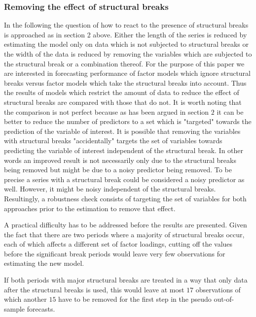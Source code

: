 \documentclass[12pt]{article}
\begin{document}
\subsubsection{Removing the effect of structural breaks}

In the following the question of how to react to the presence of structural breaks is approached as in section 2 above. Either the length of the series is reduced by estimating the model only on data which is not subjected to structural breaks or the width of the data is reduced by removing the variables which are subjected to the structural break or a combination thereof. For the purpose of this paper we are interested in forecasting performance of factor models which ignore structural breaks versus factor models which take the structural breaks into account. Thus the results of models which restrict the amount of data to reduce the effect of structural breaks are compared with those that do not. It is worth noting that the comparison is not perfect because as has been argued in section $2$ it can be better to reduce the number of predictors to a set which is "targeted" towards the prediction of the variable of interest. It is possible that removing the variables with structural breaks "accidentally" targets the set of variables towards predicting the variable of interest independent of the structural break. In other words an improved result is not necessarily only due to the structural breaks being removed but might be due to a noisy predictor being removed. To be precise a series with a structural break could be considered a noisy predictor as well. However, it might be noisy independent of the structural breaks.
Resultingly, a robustness check consists of targeting the set of variables for both approaches prior to the estimation to remove that effect.

A practical difficulty has to be addressed before the results are presented. Given the fact that there are two periods where a majority of structural breaks occur, each of which affects a different set of factor loadings, cutting off the values before the significant break periods would leave very few observations for estimating the new model.

If both periods with major structural breaks are treated in a way that only data after the structural breaks is used, this would leave at most $17$ observations of which another $15$ have to be removed for the first step in the pseudo out-of-sample forecasts.
\end{document}
